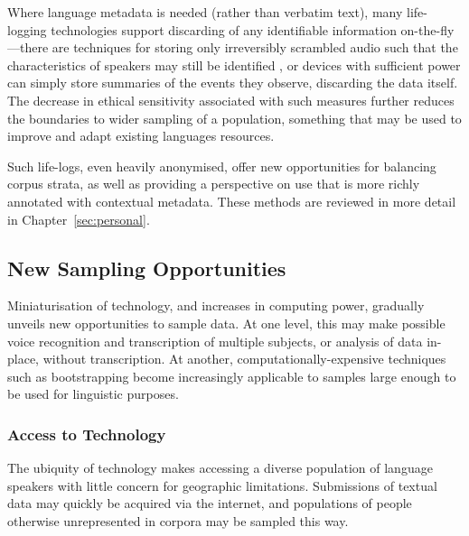 Where language metadata is needed (rather than verbatim text), many life-logging technologies support discarding of any identifiable information on-the-fly---there are techniques for storing only irreversibly scrambled audio such that the characteristics of speakers may still be identified
\cite{lee2006voice}, or devices with sufficient power can simply store summaries of the events they observe, discarding the data itself.
The decrease in ethical sensitivity associated with such measures further reduces the boundaries to wider sampling of a population, something that may be used to improve and adapt existing languages resources.



Such life-logs, even heavily anonymised, offer new opportunities for balancing corpus strata, as well as providing a perspective on use that is more richly annotated with contextual metadata.  These methods are reviewed in more detail in Chapter~\ref{sec:personal}.





\subsection{New Sampling Opportunities}
Miniaturisation of technology, and increases in computing power, gradually unveils new opportunities to sample data.  At one level, this may make possible voice recognition and transcription of multiple subjects, or analysis of data in-place, without transcription.  At another, computationally-expensive techniques such as bootstrapping become increasingly applicable to samples large enough to be used for linguistic purposes.


\subsubsection{Access to Technology}
The ubiquity of technology makes accessing a diverse population of language speakers with little concern for geographic limitations.  Submissions of textual data may quickly be acquired via the internet, and populations of people otherwise unrepresented in corpora may be sampled this way.


